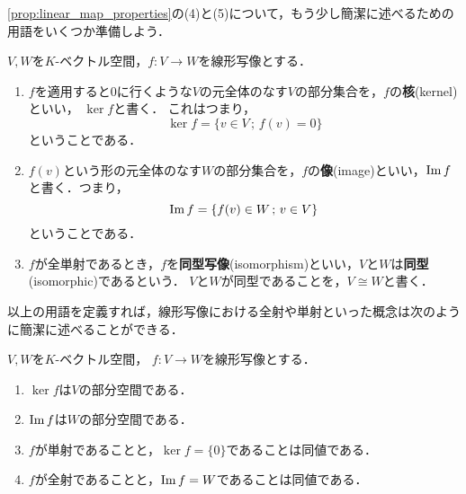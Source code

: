 \cref{prop:linear_map_properties}の(4)と(5)について，もう少し簡潔に述べるための用語をいくつか準備しよう．
\begin{dfn}
    $V,W$を$K$-ベクトル空間，$f \colon V \to W$を線形写像とする．
    \begin{enumerate}
        \item $f$を適用すると$0$に行くような$V$の元全体のなす$V$の部分集合を，$f$の\textbf{核}(kernel)といい，
        $\ker f$と書く．
        これはつまり，
        \[
            \ker f = \{ v \in V \,;\, f(v) = 0\}
        \]
        ということである．
        \item $f(v)$という形の元全体のなす$W$の部分集合を，$f$の\textbf{像}(image)といい，$\mathrm{Im}\, f$と書く．つまり，
        \[
            \mathrm{Im}\, f = \{f(v) \in W \,;\, v \in V\}
        \]
        ということである．
        \item $f$が全単射であるとき，$f$を\textbf{同型写像}(isomorphism)といい，$V$と$W$は\textbf{同型}(isomorphic)であるという．
        $V$と$W$が同型であることを，$V \cong W$と書く．
    \end{enumerate}
\end{dfn}
以上の用語を定義すれば，線形写像における全射や単射といった概念は次のように簡潔に述べることができる．
\begin{prop}
    $V,W$を$K$-ベクトル空間，
    $f \colon V \to W$を線形写像とする．
    \begin{enumerate}
        \item $\ker f$は$V$の部分空間である．
        \item $\mathrm{Im}\, f$は$W$の部分空間である．
        \item $f$が単射であることと，$\ker f = \{0\}$であることは同値である．
        \item $f$が全射であることと，$\mathrm{Im}\, f = W$であることは同値である．
    \end{enumerate}
\end{prop}
